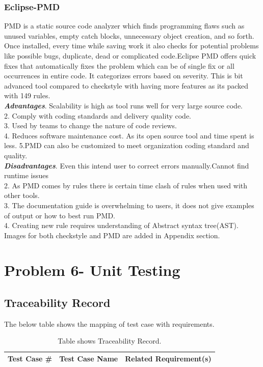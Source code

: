 \documentclass[a4paper,12pt]{article}
\begin{document}
\begin{titlepage}
\subsubsection{Eclipse-PMD}
PMD is a static source code analyzer which finds programming flaws such as unused variables, empty catch blocks, unnecessary object creation, and so forth. Once installed, every time while saving work it also checks for potential problems like possible bugs, duplicate, dead or complicated code.Eclipse PMD offers quick fixes that automatically fixes the problem which can be of single fix or all occurrences in entire code. It categorizes errors based on severity. This is bit advanced tool compared to checkstyle with having more features as its packed with 149 rules.\\
\newline
\textbf{\textit{Advantages}}. Scalability is high as tool runs well for very large source code.\\ 
2. Comply with coding standards and delivery quality code. \\
3. Used by teams to change the nature of code reviews.\\
4. Reduces software maintenance cost. As its open source tool and time spent is less.\newline
5.PMD can also be customized to meet organization coding standard and quality.\\
\newline
\textbf{\textit{Disadvantages}}. Even this intend user to correct errors manually.Cannot find runtime issues\\
2. As PMD comes by rules there is certain time clash of rules when used with other tools.\\
3. The documentation guide is overwhelming to users, it does not give examples of output or how to best run PMD. \\
4. Creating new rule requires understanding of Abstract syntax tree(AST).\\
\newline
Images for both checkstyle and PMD are added in Appendix section.

\section{Problem 6- Unit Testing}
\subsection{Traceability Record}
The below table shows the mapping of test case with requirements.
\begin{center}
\begin{longtable}{|l|l|l|}
\caption{Table shows Traceability Record.} \label{tab:long} \\
\hline \multicolumn{1}{|c|}{\textbf{Test Case #}} & \multicolumn{1}{c|}{\textbf{Test Case Name}} & \multicolumn{1}{c|}{\textbf{Related Requirement(s)}} \\ \hline 
\endfirsthead


\end{longtable}
\end{center}
\end{titlepage}
\end{document}
